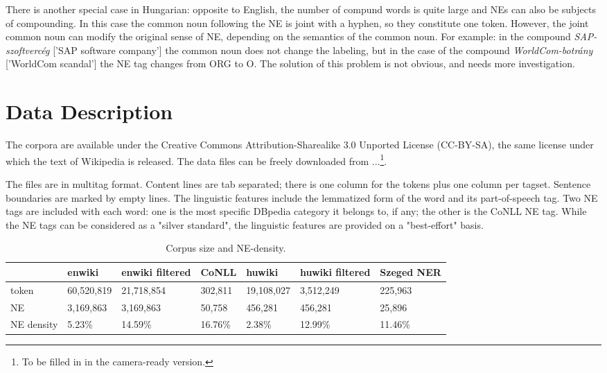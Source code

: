 \documentclass[11pt]{article}
\begin{document}
There is another special case in Hungarian: opposite to English, the number of compund words is quite large and NEs can also be subjects of compounding. In this case the common noun following the NE is joint with a hyphen, so they constitute one token. However, the joint common noun can modify the original sense of NE, depending on the semantics of the common noun. For example: in the compound \textit{SAP-szoftvercég} ['SAP software company'] the common noun does not change the labeling, but in the case of the compound \textit{WorldCom-botrány} ['WorldCom scandal'] the NE tag changes from ORG to O. The solution of this problem is not obvious, and needs more investigation.


\section{Data Description}
\label{sec:data}

The corpora are available under the Creative Commons Attribution-Sharealike 3.0 Unported License (CC-BY-SA), the same license under which the text of Wikipedia is released. The data files can be freely downloaded from ...\footnote{To be filled in in the camera-ready version.}.

The files are in multitag format. Content lines are tab separated; there is one column for the tokens plus one column per tagset. Sentence boundaries are marked by empty lines. The linguistic features include the lemmatized form of the word and its part-of-speech tag. Two NE tags are included with each word: one is the most specific DBpedia category it belongs to, if any; the other is the CoNLL NE tag. While the NE tags can be considered as a "silver standard", the linguistic features are provided on a "best-effort" basis.

\begin{table*}[ht]
\begin{center}
\begin{tabular}{lllllll}
\hline  & \bf enwiki & \bf enwiki filtered & \bf CoNLL & \bf huwiki & \bf huwiki filtered  & \bf Szeged NER \\ \hline
token & 60,520,819 & 21,718,854 & 302,811 &  19,108,027 & 3,512,249  & 225,963\\
NE & 3,169,863 & 3,169,863 & 50,758 & 456,281 & 456,281  & 25,896\\
NE density & 5.23\% & 14.59\% & 16.76\% & 2.38\% & 12.99\%  & 11.46\%\\
\hline
\end{tabular}
\end{center}
\caption{\label{size} Corpus size and NE-density.}
\end{table*}
\end{document}
